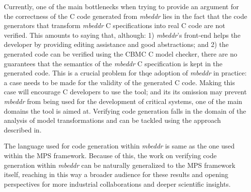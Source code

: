 Currently, one of the main bottlenecks when trying to provide an argument for
the correctness of the C code generated from \emph{mbeddr} lies in the fact that
the code generators that transform \emph{mbeddr} C specifications into real C
code are not verified. This amounts to saying that, although: 1) \emph{mbeddr}’s
front-end helps the developer by providing editing assistance and good
abstractions; and 2) the generated code can be verified using the
CBMC\cite{KroeningT14} C model checker, there are no guarantees that the
semantics of the \emph{mbeddr} C specification is kept in the generated
code.
This is a crucial problem for thqe adoption of \emph{mbeddr} in practice: a case
needs to be made for the validity of the generated C code. Making this case will
encourage C developers to use the tool; and its its omission may 
prevent \emph{mbeddr} from being used for the development of critical systems, one of
the main domains the tool is aimed at. Verifying code generation falls in the
domain of the analysis of model transformations and can be tackled using the
approach described in\cite{Lucio2014,Oakes2015}.

The language used for code generation within \emph{mbeddr} is same as the one
used within the MPS framework.
Because of this, the work on verifying code generation within \emph{mbeddr} can
be naturally generalized to the
MPS framework itself, reaching in this way a broader audience for these results
and opening perspectives for more industrial collaborations and deeper
scientific insights.



